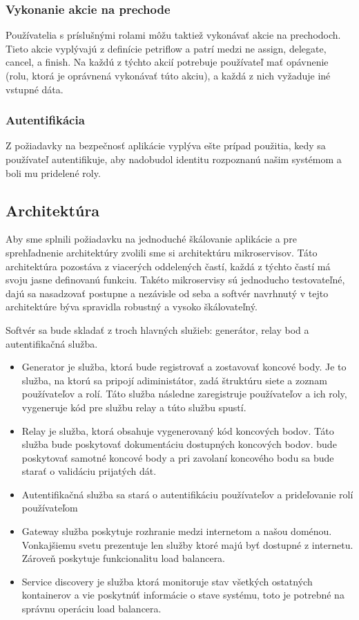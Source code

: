 \subsubsection{Vykonanie akcie na prechode} 
Používatelia s príslušnými rolami môžu taktiež vykonávať akcie na prechodoch. Tieto akcie vyplývajú z definície petriflow a patrí medzi ne assign, delegate, cancel, a finish. Na každú z týchto akcií potrebuje používateľ mať opávnenie (rolu, ktorá je oprávnená vykonávať túto akciu), a každá z nich vyžaduje iné vstupné dáta. 

\subsubsection{Autentifikácia} 
Z požiadavky na bezpečnosť aplikácie vyplýva ešte prípad použitia, kedy sa používateľ autentifikuje, aby nadobudol identitu rozpoznanú našim systémom a boli mu pridelené roly.  


\subsection{Architektúra}  
Aby sme splnili požiadavku na jednoduché škálovanie aplikácie a pre sprehľadnenie architektúry zvolili sme si architektúru mikroservisov. Táto architektúra pozostáva z viacerých oddelených častí, každá z týchto častí má svoju jasne definovanú funkciu. Takéto mikroservisy sú jednoducho testovateľné, dajú sa nasadzovať postupne a nezávisle od seba a softvér navrhnutý v tejto architektúre býva spravidla robustný a vysoko škálovateľný.   

Softvér sa bude skladať z troch hlavných služieb: generátor, relay bod a autentifikačná služba. 

\begin{itemize} 
	\item Generator je služba, ktorá bude registrovať a zostavovať koncové body. Je to služba, na ktorú sa pripojí adiministátor, zadá štruktúru siete a zoznam používateľov a rolí. Táto služba následne zaregistruje používateľov a ich roly, vygeneruje kód pre službu relay a túto službu spustí. 
	
	\item Relay je služba, ktorá obsahuje vygenerovaný kód koncových bodov. Táto služba bude poskytovať dokumentáciu dostupných koncových bodov. bude poskytovať samotné koncové body a pri zavolaní koncového bodu sa bude starať o validáciu prijatých dát. 
	
	\item Autentifikačná služba sa stará o autentifikáciu používateľov a prideľovanie rolí používateľom 
	
	\item Gateway služba poskytuje rozhranie medzi internetom a našou doménou. Vonkajšiemu svetu prezentuje len služby ktoré majú byť dostupné z internetu. Zároveň poskytuje funkcionalitu load balancera.  
	
	\item Service discovery je služba ktorá monitoruje stav všetkých ostatných kontainerov a vie poskytnúť informácie o stave systému, toto je potrebné na správnu operáciu load balancera.
	
\end{itemize} 

